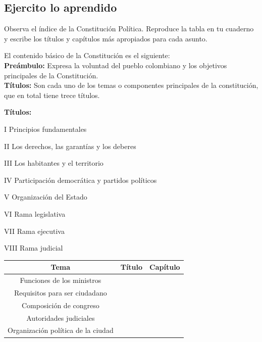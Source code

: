 \documentclass[10pt,twoside]{article}
\begin{document}
\subsection{Ejercito lo aprendido}
Observa el índice de la Constitución Política. Reproduce la tabla en tu cuaderno y escribe los títulos y capítulos más apropiados para cada asunto.

El contenido básico de la Constitución es el siguiente:\\
\textbf{Preámbulo:} Expresa la voluntad del pueblo colombiano y los objetivos principales de la Constitución.\\
\textbf{Títulos:} Son cada uno de los temas o componentes principales de la constitución, que en total tiene trece títulos.

\textbf{Títulos:}
\begin{itemize}
\begin{multicols}{2}
\item[I] Principios fundamentales
\item[II] Los derechos, las garantías y los deberes
\item[III] Los habitantes y el territorio
\item[IV] Participación democrática y partidos políticos
\item[V] Organización del Estado
\item[VI] Rama legislativa
\item[VII] Rama ejecutiva
\item[VIII] Rama judicial
\end{multicols}
\end{itemize}
\begin{center}
\begin{tabular}{|c|c|c|}
\hline 
Tema & Título & Capítulo \\ 
\hline 
Funciones de los ministros &  &  \\ 
\hline 
Requisitos para ser ciudadano &  &  \\ 
\hline 
Composición de congreso &  &  \\ 
\hline 
Autoridades judiciales &  &  \\ 
\hline 
Organización política de la ciudad &  &  \\ 
\hline 
\end{tabular} 
\end{center}
\end{document}
